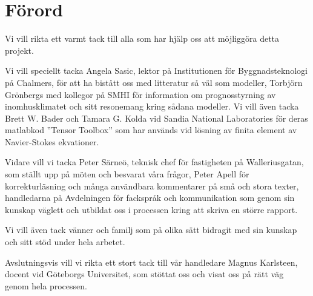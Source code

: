 \chapter*{Förord}


Vi vill rikta ett varmt tack till alla som har hjälp oss att möjliggöra detta projekt. 

Vi vill speciellt tacka Angela Sasic, lektor på Institutionen för Byggnadsteknologi på Chalmers, för att ha bistått oss med litteratur så väl som modeller, Torbjörn Grönbergs med kollegor på SMHI för information om prognosstyrning av inomhusklimatet och sitt resonemang kring sådana modeller. Vi vill även tacka Brett W. Bader och Tamara G. Kolda vid Sandia National Laboratories för deras matlabkod ''Tensor Toolbox'' som har används vid lösning av finita element av Navier-Stokes ekvationer.

Vidare vill vi tacka Peter Särneö, teknisk chef för fastigheten på Walleriusgatan, som ställt upp på möten och besvarat våra frågor, Peter Apell för korrekturläsning och många användbara kommentarer på små och stora texter, handledarna på Avdelningen för fackspråk och kommunikation som genom sin kunskap väglett och utbildat oss i processen kring att skriva en större rapport.

Vi vill även tack vänner och familj som på olika sätt bidragit med sin kunskap och sitt stöd under hela arbetet.

Avslutningsvis vill vi rikta ett stort tack till vår handledare Magnus Karlsteen, docent vid Göteborgs Universitet, som stöttat oss och visat oss på rätt väg genom hela processen.

